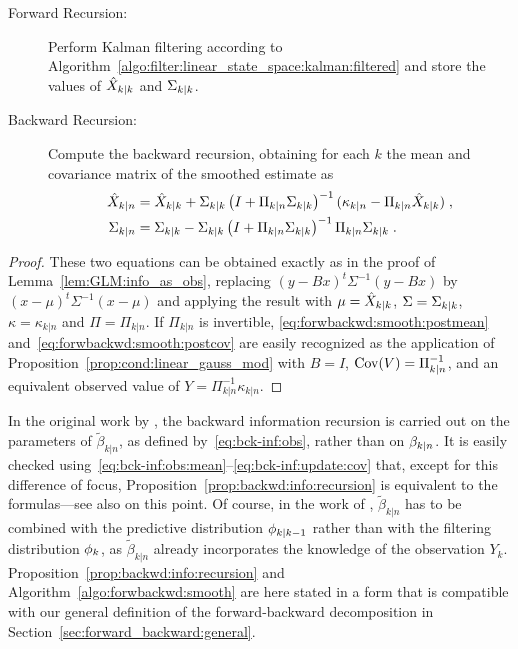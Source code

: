 \begin{algo}
\label{algo:forwbackwd:smooth}
\begin{description}
\item[Forward Recursion:] Perform Kalman filtering according to
  Algorithm~\ref{algo:filter:linear_state_space:kalman:filtered} and store the
  values of $\hat{X}_{k|k}$ and $\Sigma_{k|k}$.
\item[Backward Recursion:] Compute the backward recursion, obtaining
  for each $k$
  the mean and covariance matrix of the smoothed estimate as
  \begin{align}
    \label{eq:forwbackwd:smooth:postmean}
    \hat{X}_{k|n} & = \hat{X}_{k|k} + \Sigma_{k|k}\left(I + \Pi_{k|n}\Sigma_{k|k}\right)^{-1}(\kappa_{k|n} - \Pi_{k|n}\hat{X}_{k|k}) \; , \\
    \label{eq:forwbackwd:smooth:postcov}
    \Sigma_{k|n} & = \Sigma_{k|k} - \Sigma_{k|k}\left(I + \Pi_{k|n}\Sigma_{k|k}\right)^{-1}\Pi_{k|n}\Sigma_{k|k} \; .
  \end{align}
\end{description}
\end{algo}

\begin{proof}
  These two equations can be obtained exactly as in the proof of
  Lemma~\ref{lem:GLM:info_as_obs}, replacing $(y-Bx)^t\Sigma^{-1}(y-Bx)$ by
  $(x-\mu)^t\Sigma^{-1}(x-\mu)$ and applying the result with
  $\mu=\hat{X}_{k|k}$, $\Sigma = \Sigma_{k|k}$, $\kappa = \kappa_{k|n}$ and $\Pi
  = \Pi_{k|n}$. If $\Pi_{k|n}$ is invertible,
  \eqref{eq:forwbackwd:smooth:postmean}
  and~\eqref{eq:forwbackwd:smooth:postcov} are easily recognized as the
  application of Proposition~\ref{prop:cond:linear_gauss_mod} with $B = I$,
  $\operatorname{Cov}(V) = \Pi_{k|n}^{-1}$, and an equivalent observed value of $Y =
  \Pi_{k|n}^{-1} \kappa_{k|n}$.
\end{proof}

\begin{rem}
  In the original work by \cite{mayne:1966}, the backward information recursion
  is carried out on the parameters of $\tilde{\beta}_{k|n}$, as defined
  by~\eqref{eq:bck-inf:obs}, rather than on $\beta_{k|n}$.  It is easily
  checked using~\eqref{eq:bck-inf:obs:mean}--\eqref{eq:bck-inf:update:cov} that,
  except for this difference of focus,
  Proposition~\ref{prop:backwd:info:recursion} is equivalent to the
  \cite{mayne:1966} formulas---see also
  \cite[Section~10.4]{kailath:sayed:hassibi:2000} on this point.
  Of course, in the work of
  \cite{mayne:1966}, $\tilde{\beta}_{k|n}$ has to be combined with the
  predictive distribution $\pred{k}{k-1}$ rather than with the filtering
  distribution $\filt{k}$, as $\tilde{\beta}_{k|n}$ already incorporates the
  knowledge of the observation $Y_k$.
  Proposition~\ref{prop:backwd:info:recursion} and
  Algorithm~\ref{algo:forwbackwd:smooth} are here stated in a form that is
  compatible with our general definition of the forward-backward decomposition
  in Section~\ref{sec:forward_backward:general}.
\end{rem}

